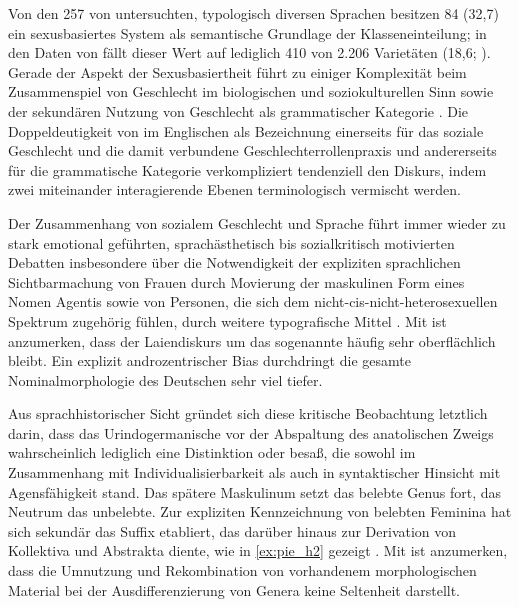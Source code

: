 Von den 257 von \citet{corbett2013b} untersuchten, typologisch diversen
Sprachen besitzen 84 (32,7\pct) ein sexusbasiertes System als semantische
Grundlage der Klasseneinteilung; in den Daten von 
\autocite{skirgardetal2023} fällt dieser Wert auf lediglich 410 von 2.206
Varietäten (18,6\pct; \cite[siehe][]{haynie:gb051}). Gerade der Aspekt der
Sexusbasiertheit führt zu einiger Komplexität beim Zusammenspiel von Geschlecht
im biologischen und soziokulturellen Sinn sowie der sekundären Nutzung von
Geschlecht als grammatischer Kategorie \autocites[dazu
ausführlich][]{kotthoffnuebling2018}{steriopolosteriopolo2022}. Die
Doppeldeutigkeit von  im Englischen als Bezeichnung einerseits für
das soziale Geschlecht und die damit verbundene Geschlechter\-rollen\-praxis
und andererseits für die grammatische Kategorie verkompliziert tendenziell den
Diskurs, indem zwei miteinander interagierende Ebenen terminologisch vermischt
werden.

Der Zusammenhang von sozialem Geschlecht und Sprache führt immer wieder zu
stark emotional geführten, sprachästhetisch bis sozialkritisch motivierten
Debatten insbesondere über die Notwendigkeit der expliziten sprachlichen
Sichtbarmachung von Frauen durch Movierung der maskulinen Form eines Nomen
Agentis sowie von Personen, die sich dem nicht-cis-nicht-heterosexuellen
Spektrum zugehörig fühlen, durch weitere typografische Mittel \autocite[dazu
kritisch resümierend][]{kasper2022}. Mit \citet[61--89]{kotthoffnuebling2018}
ist anzumerken, dass der Laiendiskurs um das sogenannte  häufig
sehr oberflächlich bleibt. Ein explizit andro\-zentrischer Bias durchdringt die
gesamte Nominalmorphologie des Deutschen sehr viel tiefer.

Aus sprachhistorischer Sicht gründet sich diese kritische Beobachtung letztlich
darin, dass das Urindogermanische vor der Abspaltung des anatolischen Zweigs
wahrscheinlich lediglich eine Distinktion \leipzigfont{[±\,belebt]} oder
\leipzigfont{[±\,human]} besaß, die sowohl im Zusammenhang mit
Individualisierbarkeit als auch in syntaktischer Hinsicht mit Agensfähigkeit
stand. Das spätere Maskulinum setzt das belebte Genus fort, das Neutrum das
unbelebte. Zur expliziten Kennzeichnung von belebten Feminina hat sich sekundär
das Suffix  etabliert, das darüber hinaus zur Derivation von
Kollektiva und Abstrakta diente, wie in \cref{ex:pie_h2} gezeigt
\autocites%
	[73--74, 77]{ringe2017}%
	[195--197, 205--207]{fritzmeierbruegger2021}%
	[167--172]{klein2022}%
. Mit \citet[313]{corbett1991} ist anzumerken, dass die Umnutzung und
Rekombination von vorhandenem morphologischen Material bei der
Ausdifferenzierung von Genera keine Seltenheit darstellt.

